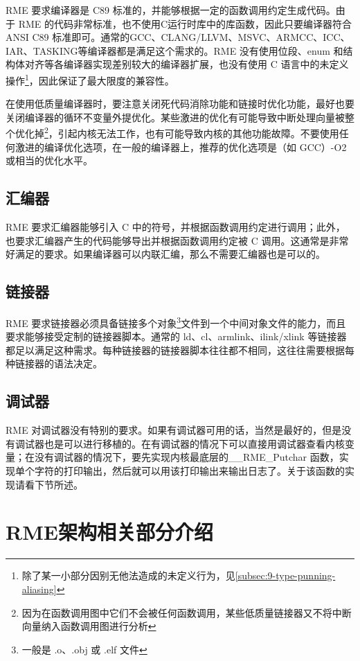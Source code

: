 RME 要求编译器是 C89 标准的，并能够根据一定的函数调用约定生成代码。由于 RME 的代码非常标准，也不使用C运行时库中的库函数，因此只要编译器符合 ANSI C89 标准即可。通常的GCC、CLANG/LLVM、MSVC、ARMCC、ICC、IAR、TASKING等编译器都是满足这个需求的。RME 没有使用位段、enum 和结构体对齐等各编译器实现差别较大的编译器扩展，也没有使用 C 语言中的未定义操作\footnote{除了某一小部分因别无他法造成的未定义行为，见\ref{subsec:9-type-punning-aliasing}}，因此保证了最大限度的兼容性。

在使用低质量编译器时，要注意关闭死代码消除功能和链接时优化功能，最好也要关闭编译器的循环不变量外提优化。某些激进的优化有可能导致中断处理向量被整个优化掉\footnote{因为在函数调用图中它们不会被任何函数调用，某些低质量链接器又不将中断向量纳入函数调用图进行分析}，引起内核无法工作，也有可能导致内核的其他功能故障。不要使用任何激进的编译优化选项，在一般的编译器上，推荐的优化选项是（如 GCC）-O2 或相当的优化水平。

\subsection{汇编器}\label{subsec:7-assembler}

RME 要求汇编器能够引入 C 中的符号，并根据函数调用约定进行调用；此外，也要求汇编器产生的代码能够导出并根据函数调用约定被 C 调用。这通常是非常好满足的要求。如果编译器可以内联汇编，那么不需要汇编器也是可以的。

\subsection{链接器}\label{subsec:7-linker}

RME 要求链接器必须具备链接多个对象\footnote{一般是 .o、.obj 或 .elf 文件}文件到一个中间对象文件的能力，而且要求能够接受定制的链接器脚本。通常的 ld、cl、armlink、ilink/xlink 等链接器都足以满足这种需求。每种链接器的链接器脚本往往都不相同，这往往需要根据每种链接器的语法决定。

\subsection{调试器}\label{subsec:7-debugger}

RME 对调试器没有特别的要求。如果有调试器可用的话，当然是最好的，但是没有调试器也是可以进行移植的。在有调试器的情况下可以直接用调试器查看内核变量；在没有调试器的情况下，要先实现内核最底层的\_\_RME\_Putchar 函数，实现单个字符的打印输出，然后就可以用该打印输出来输出日志了。关于该函数的实现请看下节所述。

\section{RME架构相关部分介绍}\label{sec:7-architecture-dependent-parts-overview}

